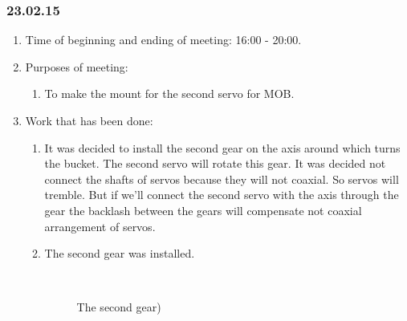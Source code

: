 \subsubsection{23.02.15}
\begin{enumerate}
	
	\item Time of beginning and ending of meeting: 16:00 - 20:00.
	
	\item Purposes of meeting: 
	\begin{enumerate}
		
		\item To make the mount for the second servo for MOB.
		
	\end{enumerate}

	\item Work that has been done:
	\begin{enumerate}
		
		\item It was decided to install the second gear on the axis around which turns the bucket. The second servo will rotate this gear. It was decided not connect the shafts of servos because they will not coaxial. So servos will tremble. But if we'll connect the second servo with the axis through the gear the backlash between the gears will compensate not coaxial arrangement of servos.
		
		\item The second gear was installed.
		\begin{figure}[H]
			\begin{minipage}[h]{0.2\linewidth}
				\center  
			\end{minipage}
			\begin{minipage}[h]{0.6\linewidth}
				\caption{The second gear)}
			\end{minipage}
		\end{figure}


\end{enumerate}
\end{enumerate}
